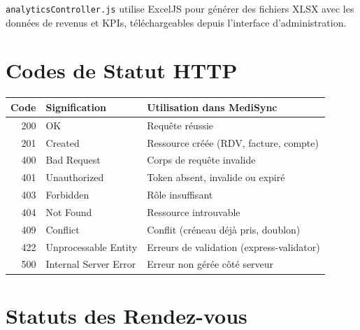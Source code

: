 \documentclass[12pt,a4paper]{report}
\begin{document}
\texttt{analyticsController.js} utilise ExcelJS pour générer des fichiers XLSX avec les données de revenus et KPIs, téléchargeables depuis l'interface d'administration.

\appendix

\chapter{Codes de Statut HTTP}

\begin{center}
\small
\begin{tabular}{@{} r l p{7cm} @{}}
  \toprule
  \textbf{Code} & \textbf{Signification} & \textbf{Utilisation dans MediSync} \\
  \midrule
  200 & OK                    & Requête réussie \\
  201 & Created               & Ressource créée (RDV, facture, compte) \\
  400 & Bad Request           & Corps de requête invalide \\
  401 & Unauthorized          & Token absent, invalide ou expiré \\
  403 & Forbidden             & Rôle insuffisant \\
  404 & Not Found             & Ressource introuvable \\
  409 & Conflict              & Conflit (créneau déjà pris, doublon) \\
  422 & Unprocessable Entity  & Erreurs de validation (express-validator) \\
  500 & Internal Server Error & Erreur non gérée côté serveur \\
  \bottomrule
\end{tabular}
\end{center}

\chapter{Statuts des Rendez-vous}
\end{document}
